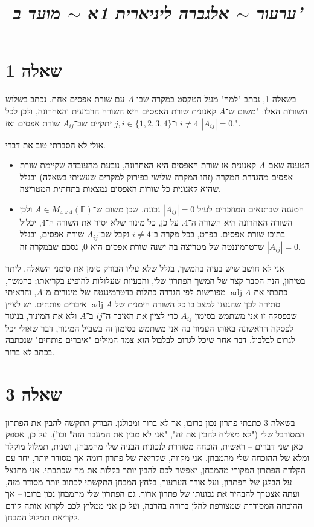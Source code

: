 \documentclass[]{article}
\title{\textit{ערעור $\sim$ אלגברה ליניארית 1א $\sim$ מועד ב'}}
\DeclareMathOperator{\adj}    {adj}
\newcommand\F         {\mathbb{F}}
\theoremstyle{definition}
\begin{document}
	\maketitle
	
	\section*{שאלה 1}
	בשאלה 1, נכתב "למה" מעל הטקסט במקרה שבו $A$ עם שורת אפסים אחת. נכתב בשלוש השורות האלו: 
	"משום ש־$A$ קאנונית שורת האפסים היא השורה הרביעית והאחרונה, ולכן לכל $i \neq 4$ ו־$j, i \in \{1, 2, 3, 4\}$ יתקיים שב־$A_{ij}$ שורת אפסים ואז $|A_{ij}| = 0$.". 
	
	אולי לא הסברתי טוב את דברי. 
	\begin{itemize}
		\item הטענה שאם $A$ קאנונית אז שורת האפסים היא האחרונה, נובעת מהעובדה שקיימת שורת אפסים מהגדרת המקרה (זהו המקרה שלישי בפירוק למקרים שעשיתי בשאלה) ובגלל שהיא קאנונית כל שורות האפסים נמצאות בתחתית המטריצה. 
		\item הטענה שבתנאים המוזכרים לעיל $|A_{ij}| = 0$ נכונה, שכן משום ש־$A \in M_{4 \times 4}(\F)$ ולכן השורה האחרונה היא השורה ה־$4$. על כן, כל מינור שלא יסיר את השורה ה־$4$, יכלול בתוכו שורת אפסים. בפרט, בכל מקרה ב־$i \neq 4$ נקבל שב־$A_{ij}$ שורת אפסים, ובגלל שדטרמיננטה של מטריצה בה ישנה שורת אפסים היא $0$, נסכם שבמקרה זה $|A_{ij}| = 0$. 
	\end{itemize}
	
	אני לא חושב שיש בעיה בהמשך, בגלל שלא עליו הבודק סימן את סימני השאלה. ליתר בטיחון, הנה הסבר קצר של המשך הפתרון שלי, והבעיות שעלולות להופיע בקריאתו; בהמשך, כתבתי את $\adj A$ מפורשות לפי הגדרה כתלות בדטרמיננטה של מינורים מ־$A$, והראיתי סתירה לכך שהגענו למצב בו כל השורה הימנית של $\adj A$ איברים פותחים. יש לציין שבפסקה זו אני משתמש בסימון $A_{ij}$ כדי לציין את האיבר ה־$ij$ ב־$A$ ולא את המינור, בניגוד לפסקה הראשונה באותו העמוד בה אני משתמש בסימון זה בשביל המינור, דבר שאולי יכל לגרום לבלבול. דבר אחר שיכל לגרום לבלבול הוא צמד המילים "איברים פותחים" שנכתבה בכתב לא ברור. 
	
	\section*{שאלה 3}
	בשאלה 3 כתבתי פתרון נכון ברובו, אך לא ברור ומבולגן. הבודק התקשה להבין את הפתרון המסורבל שלי ("לא מצליח להבין את זה", "אני לא מבין את המעבר הזה" וכו'). על כן, אספק כאן שני דברים – ראשית, הוכחה מסודרת לנכונות הבניה שלי מהמבחן, ושנית, תמלול מוקלד ומלא של ההוכחה שלי מהמבחן. אני מקווה, שקריאה של פתרון דומה אך מסודר יותר, יחד עם הקלדת הפתרון המקורי מהמבחן, יאפשר לכם להבין יותר בקלות את מה שכתבתי. אני מתנצל על הבלגן של הפתרון, ועל אורך הערעור, בלחץ המבחן התקשתי לכתוב יותר מסודר מזה, ועתה אצטרך להבהיר את נכונותו של פתרון ארוך. גם הפתרון שלי מהמבחן נכון ברובו – אך ההוכחה המסודרת שמצורפת להלן ברורה בהרבה, ועל כן אני ממליץ לכם לקרוא אותה קודם לקריאת תמלול המבחן. 
	
\end{document}
